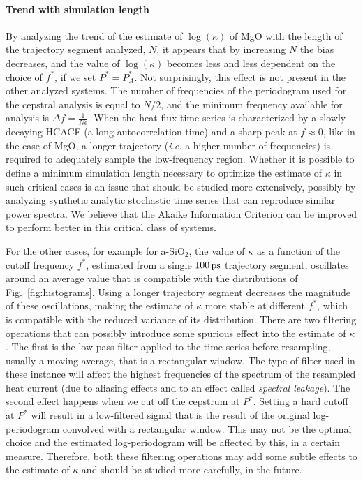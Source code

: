\begin{LEtext}
\paragraph{Trend with simulation length}
By analyzing the trend of the estimate of $\log(\kappa)$ of MgO with the length of the trajectory segment analyzed, $N$, it appears that by increasing $N$ the bias decreases, and the value of $\log(\kappa)$ becomes less and less dependent on the choice of $f^*$, if we set $P^*=P_A^*$. Not surprisingly, this effect is not present in the other analyzed systems. The number of frequencies of the periodogram used for the cepstral analysis is equal to $N/2$, and the minimum frequency available for analysis is $\Delta f = \frac{1}{N\epsilon}$. 
When the heat flux time series is characterized by a slowly decaying HCACF (a long autocorrelation time) and a sharp peak at $f\approx 0$, like in the case of MgO, a longer trajectory (\emph{i.e.} a higher number of frequencies) is required to adequately sample the low-frequency region. 
Whether it is possible to define a minimum simulation length necessary to optimize the estimate of $\kappa$ in such critical cases is an issue that should be studied more extensively, possibly by analyzing synthetic analytic stochastic time series that can reproduce similar power spectra. 
We believe that the Akaike Information Criterion can be improved to perform better in this critical class of systems. 

For the other cases, for example for a-SiO$_2$, the value of $\kappa$ as a function of the cutoff frequency $f^*$, estimated from a single $100\,\mathrm{ps}$ trajectory segment, oscillates around an average value that is compatible with the distributions of Fig.~\ref{fig:histograms}. 
Using a longer trajectory segment decreases the magnitude of these oscillations, making the estimate of $\kappa$ more stable at different $f^*$, which is compatible with the reduced variance of its distribution. 
There are two filtering operations that can possibly introduce some spurious effect into the estimate of $\kappa$. 
The first is the low-pass filter applied to the time series before resampling, usually a moving average, that is a rectangular window. 
The type of filter used in these instance will affect the highest frequencies of the spectrum of the resampled heat current (due to aliasing effects and to an effect called \emph{spectral leakage}). 
The second effect happens when we cut off the cepstrum at $P^*$. Setting a hard cutoff at $P^*$ will result in a low-filtered signal that is the result of the original log-periodogram convolved with a rectangular window. This may not be the optimal choice and the estimated log-periodogram will be affected by this, in a certain measure. 
Therefore, both these filtering operations may add some subtle effects to the estimate of $\kappa$ and should be studied more carefully, in the future. 
\end{LEtext}



